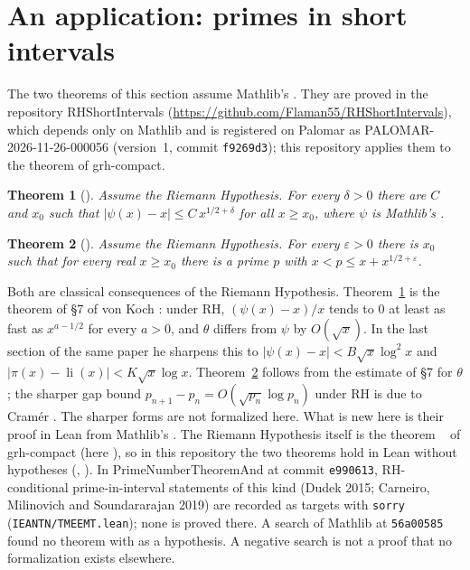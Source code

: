 \documentclass[11pt]{article}
\newtheorem{theorem}{Theorem}[section]
\theoremstyle{definition}
\theoremstyle{remark}
\begin{document}
\section{An application: primes in short intervals}\label{sec:short}

The two theorems of this section assume Mathlib's . They are proved in
the repository RHShortIntervals (\url{https://github.com/Flaman55/RHShortIntervals}), which depends
only on Mathlib and is registered on Palomar as PALOMAR-2026-11-26-000056 (version~1, commit
\texttt{f9269d3}); this repository applies them to the theorem of grh-compact.

\begin{theorem}[]\label{thm:psi}
Assume the Riemann Hypothesis. For every $\delta>0$ there are $C$ and $x_0$ such that $|\psi(x)-x|\le C\,x^{1/2+\delta}$ for all
$x\ge x_0$, where $\psi$ is Mathlib's .
\end{theorem}

\begin{theorem}[]\label{thm:short}
Assume the Riemann Hypothesis. For every $\varepsilon>0$ there is $x_0$ such that for every real $x\ge x_0$ there is a prime $p$
with $x<p\le x+x^{1/2+\varepsilon}$.
\end{theorem}

Both are classical consequences of the Riemann Hypothesis. Theorem~\ref{thm:psi} is the theorem of
\S7 of von Koch \cite{vonKoch1901}: under RH, $(\psi(x)-x)/x$ tends to $0$ at least as fast as
$x^{a-1/2}$ for every $a>0$, and $\theta$ differs from $\psi$ by $O(\sqrt x)$. In the last section
of the same paper he sharpens this to $|\psi(x)-x|<B\sqrt x\log^2x$ and
$|\pi(x)-\operatorname{li}(x)|<K\sqrt x\log x$. Theorem~\ref{thm:short} follows from the estimate
of \S7 for $\theta$; the sharper gap bound $p_{n+1}-p_n=O(\sqrt{p_n}\log p_n)$ under RH is due to
Cramér \cite{Cramer1920}. The sharper forms are not formalized here. What is new here is their proof in Lean from
Mathlib's . The Riemann Hypothesis itself is the theorem
~ of grh-compact (here ),
so in this repository the two theorems hold in Lean without hypotheses
(, ). In PrimeNumberTheoremAnd \cite{PNT} at commit
\texttt{e990613}, RH-conditional prime-in-interval statements of this kind (Dudek 2015;
Carneiro, Milinovich and Soundararajan 2019) are recorded as targets with \texttt{sorry}
(\texttt{IEANTN/TMEEMT.lean}); none is proved there. A search of Mathlib at \texttt{56a00585} found
no theorem with  as a hypothesis. A negative search is not a proof that no
formalization exists elsewhere.
\end{document}
